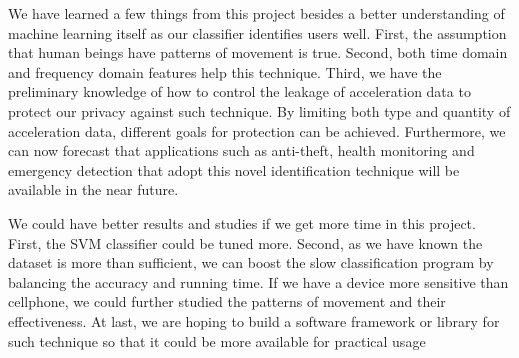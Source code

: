\documentclass{article} %
\begin{document}
We have learned a few things from this project besides a better understanding of machine learning itself as our classifier identifies users well. First, the assumption that human beings have patterns of movement is true. Second, both time domain and frequency domain features help this technique. Third, we have the preliminary knowledge of how to control the leakage of acceleration data to protect our privacy against such technique. By limiting both type and quantity of acceleration data, different goals for protection can be achieved. Furthermore, we can now forecast that applications such as anti-theft, health monitoring and emergency detection that adopt this novel identification technique will be available in the near future.

We could have better results and studies if we get more time in this project. First, the SVM classifier could be tuned more. Second, as we have known the dataset is more than sufficient, we can boost the slow classification program by balancing the accuracy and running time. If we have a device more sensitive than cellphone, we could further studied the patterns of movement and their effectiveness. At last, we are hoping to build a software framework or library for such technique so that it could be more available for practical usage 




\end{document}
